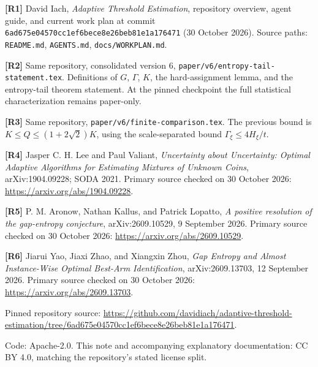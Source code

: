 \documentclass[
  11pt,
  a4paper,
]{article}
\begin{document}
\textbf{{[}R1{]}} David Iach, \emph{Adaptive Threshold Estimation},
repository overview, agent guide, and current work plan at commit
\texttt{6ad675e04570cc1ef6bece8e26beb81e1a176471} (30 October 2026).
Source paths: \texttt{README.md}, \texttt{AGENTS.md},
\texttt{docs/WORKPLAN.md}.

\textbf{{[}R2{]}} Same repository, consolidated version 6,
\texttt{paper/v6/entropy-tail-statement.tex}. Definitions of \(G\),
\(\Gamma\), \(K\), the hard-assignment lemma, and the entropy-tail
theorem statement. At the pinned checkpoint the full statistical
characterization remains paper-only.

\textbf{{[}R3{]}} Same repository,
\texttt{paper/v6/finite-comparison.tex}. The previous bound is
\(K\le Q\le(1+2\sqrt2)K\), using the scale-separated bound
\(\Gamma_\xi\le4H_\xi/t\).

\textbf{{[}R4{]}} Jasper C. H. Lee and Paul Valiant, \emph{Uncertainty
about Uncertainty: Optimal Adaptive Algorithms for Estimating Mixtures
of Unknown Coins}, arXiv:1904.09228; SODA 2021. Primary source checked
on 30 October 2026: \url{https://arxiv.org/abs/1904.09228}.

\textbf{{[}R5{]}} P. M. Aronow, Nathan Kallus, and Patrick Lopatto,
\emph{A positive resolution of the gap-entropy conjecture},
arXiv:2609.10529, 9 September 2026. Primary source checked on 30 October
2026: \url{https://arxiv.org/abs/2609.10529}.

\textbf{{[}R6{]}} Jiarui Yao, Jiaxi Zhao, and Xiangxin Zhou, \emph{Gap
Entropy and Almost Instance-Wise Optimal Best-Arm Identification},
arXiv:2609.13703, 12 September 2026. Primary source checked on 30
October 2026: \url{https://arxiv.org/abs/2609.13703}.

Pinned repository source:
\url{https://github.com/davidiach/adaptive-threshold-estimation/tree/6ad675e04570cc1ef6bece8e26beb81e1a176471}.

Code: Apache-2.0. This note and accompanying explanatory documentation:
CC BY 4.0, matching the repository's stated license split.
\end{document}
